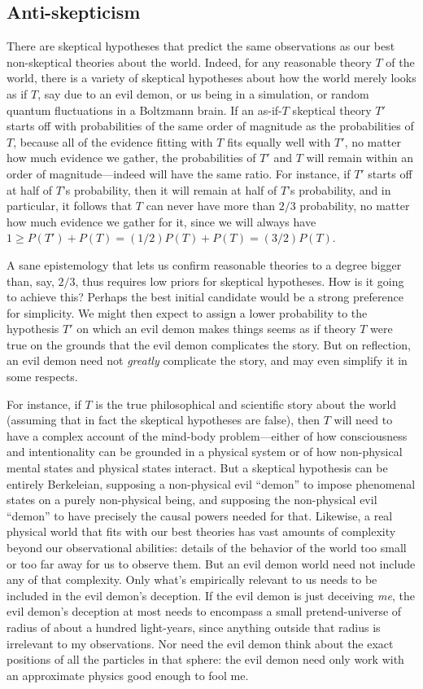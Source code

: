 \subsection{Anti-skepticism}\label{sec:skepticism}
There are skeptical hypotheses that predict the same observations as our best non-skeptical theories
about the world. Indeed, for any reasonable theory $T$ of the world, there is a variety of skeptical hypotheses about
how the world merely looks as if $T$, say due to an evil demon, or us being in a simulation, or random quantum 
fluctuations in a Boltzmann brain. If an as-if-$T$ skeptical theory $T'$ starts off with probabilities of the same
order of magnitude as the probabilities of $T$, because all of the evidence fitting with $T$ fits equally well with $T'$, 
no matter how much evidence we gather, the probabilities of $T'$ and $T$ will remain within an order of magnitude---indeed will have the same
ratio. For instance, if
$T'$ starts off at half of $T$'s probability, then it will remain at half of $T$'s probability, and in particular, 
it follows that $T$ can never have more than $2/3$ probability, no matter how much evidence we gather for it,
since we will always have $1 \ge P(T')+P(T) = (1/2)P(T)+P(T) = (3/2)P(T)$. 

A sane epistemology that lets us confirm reasonable theories to a degree bigger than, say, $2/3$, thus requires low 
priors for skeptical hypotheses. How is it going to achieve this?
Perhaps the best initial candidate would be a strong preference for simplicity. We might then expect to assign a lower probability to the hypothesis $T'$ 
on which an evil demon makes things seems as if theory $T$ were true on the grounds that the evil demon complicates 
the story. But on reflection, an evil demon need not \textit{greatly} complicate the story, and may even simplify it 
in some respects.

For instance, if $T$ is the true philosophical and scientific story about the world (assuming that in fact
the skeptical hypotheses are false), then $T$ will need to have a complex account of the mind-body problem---either 
of how consciousness and intentionality can be grounded in a physical system or of how non-physical mental states 
and physical states interact. But a skeptical hypothesis can be entirely
Berkeleian, supposing a non-physical evil ``demon'' to impose phenomenal states on a purely non-physical being, and supposing
the non-physical evil ``demon'' to have precisely the causal powers needed for that. Likewise, 
a real physical world that fits with our best theories has vast amounts of complexity beyond our observational
abilities: details of the behavior of the world too small or too far away for us to observe them. But an 
evil demon world need not include any of that complexity. Only what's empirically relevant to us needs to be included 
in the evil demon's deception. If the evil demon is just deceiving \textit{me}, the evil demon's deception at most 
needs to encompass a small pretend-universe of radius of about a hundred light-years, since anything outside that radius is
irrelevant to my observations. Nor need the evil demon think about the exact positions of all the particles in that sphere:
the evil demon need only work with an approximate physics good enough to fool me. 

